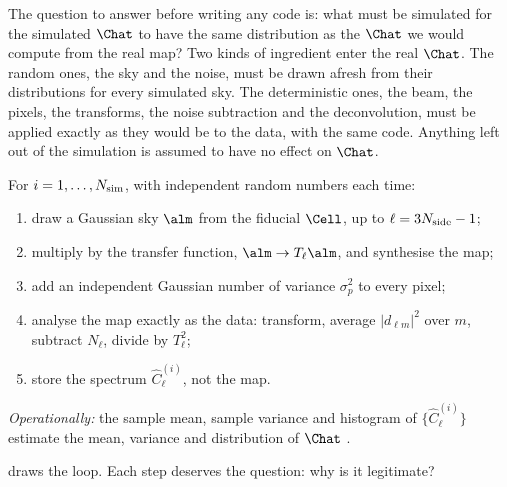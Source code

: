 The question to answer before writing any code is: what must be simulated for the simulated
$\Chat$ to have the same distribution as the $\Chat$ we would compute from the real map? Two
kinds of ingredient enter the real $\Chat$. The random ones, the sky and the noise, must be
drawn afresh from their distributions for every simulated sky. The deterministic ones, the
beam, the pixels, the transforms, the noise subtraction and the deconvolution, must be applied
exactly as they would be to the data, with the same code. Anything left out of the simulation
is assumed to have no effect on $\Chat$.

\begin{workdef}
For $i=1,\dots,N_{\rm sim}$, with independent random numbers each time:
\begin{enumerate}
  \item draw a Gaussian sky $\alm$ from the fiducial $\Cell$, up to $\ell=3N_{\rm side}-1$;
  \item multiply by the transfer function, $\alm\to T_\ell\alm$, and synthesise the map;
  \item add an independent Gaussian number of variance $\sigma_p^2$ to every pixel;
  \item analyse the map exactly as the data: transform, average $|d_{\ell m}|^2$ over $m$,
        subtract $N_\ell$, divide by $T_\ell^2$;
  \item store the spectrum $\widehat C^{(i)}_\ell$, not the map.
\end{enumerate}
\emph{Operationally:} the sample mean, sample variance and histogram of
$\{\widehat C^{(i)}_\ell\}$ estimate the mean, variance and distribution of $\Chat$
.
\end{workdef}

 draws the loop. Each step deserves the question: why is it
legitimate?

